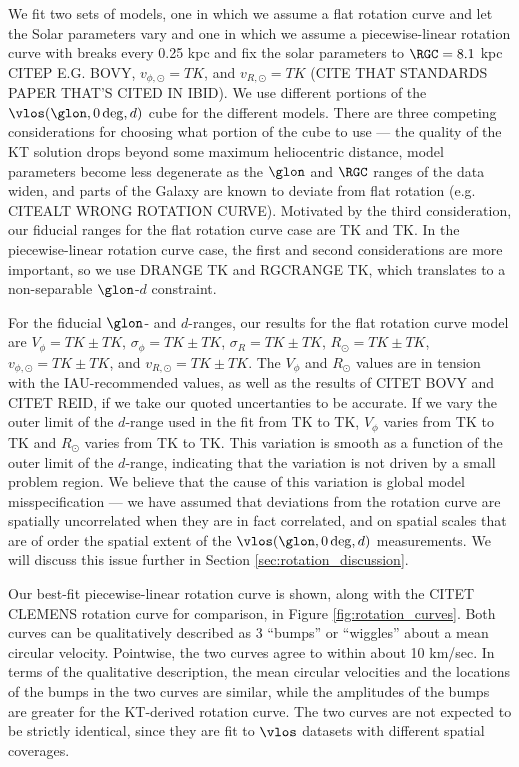 We fit two sets of models, one in which we assume a flat rotation curve and let the Solar parameters vary and one in which we assume a piecewise-linear rotation curve with breaks every 0.25 kpc and fix the solar parameters to $\RGC=8.1$ kpc CITEP E.G. BOVY, $v_{\phi, \odot}=TK$, and $v_{R, \odot}=TK$ (CITE THAT STANDARDS PAPER THAT'S CITED IN IBID).
We use different portions of the $\vlos(\glon, 0\deg, d)$ cube for the different models. 
There are three competing considerations for choosing what portion of the cube to use --- the quality of the KT solution drops beyond some maximum heliocentric distance, model parameters become less degenerate as the $\glon$ and $\RGC$ ranges of the data widen, and parts of the Galaxy are known to deviate from flat rotation (e.g. CITEALT WRONG ROTATION CURVE). 
Motivated by the third consideration, our fiducial ranges for the flat rotation curve case are TK and TK. 
In the piecewise-linear rotation curve case, the first and second considerations are more important, so we use DRANGE TK and RGCRANGE TK, which translates to a non-separable $\glon$-$d$ constraint.

For the fiducial $\glon$- and $d$-ranges, our results for the flat rotation curve model are $V_\phi=TK \pm TK$, $\sigma_\phi = TK \pm TK$, $\sigma_R = TK \pm TK$, $R_\odot = TK \pm TK$, $v_{\phi, \odot} = TK \pm TK$, and $v_{R, \odot} = TK \pm TK$.
The $V_\phi$ and $R_{\odot}$ values are in tension with the IAU-recommended values, as well as the results of CITET BOVY and CITET REID, if we take our quoted uncertanties to be accurate. 
If we vary the outer limit of the $d$-range used in the fit from TK to TK, $V_\phi$ varies from TK to TK and $R_\odot$ varies from TK to TK. 
This variation is smooth as a function of the outer limit of the $d$-range, indicating that the variation is not driven by a small problem region.
We believe that the cause of this variation is global model misspecification --- we have assumed that deviations from the rotation curve are spatially uncorrelated when they are in fact correlated, and on spatial scales that are of order the spatial extent of the $\vlos(\glon, 0\deg, d)$ measurements.
We will discuss this issue further in Section \ref{sec:rotation_discussion}. 

Our best-fit piecewise-linear rotation curve is shown, along with the CITET CLEMENS rotation curve for comparison, in Figure \ref{fig:rotation_curves}. 
Both curves can be qualitatively described as 3 ``bumps'' or ``wiggles'' about a mean circular velocity. 
Pointwise, the two curves agree to within about 10 km/sec. 
In terms of the qualitative description, the mean circular velocities and the locations of the bumps in the two curves are similar, while the amplitudes of the bumps are greater for the KT-derived rotation curve. 
The two curves are not expected to be strictly identical, since they are fit to $\vlos$ datasets with different spatial coverages.



